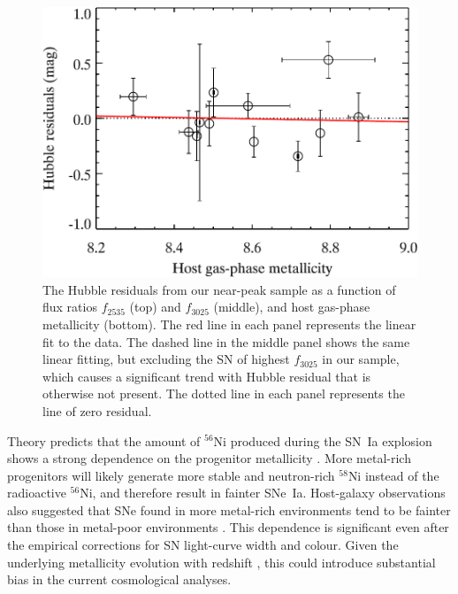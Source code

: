 \documentclass[useAMS,usenatbib]{mn2e}
\begin{document}
\begin{figure}
		\includegraphics[scale=0.49]{plot/metallicity_hrs.pdf}
                \caption{The Hubble residuals from our near-peak sample as a function of flux ratios $f_{2535}$ (top) and $f_{3025}$ (middle), and host gas-phase metallicity (bottom). The red line in each panel represents the linear fit to the data. The dashed line in the middle panel shows the same linear fitting, but excluding the SN of highest $f_{3025}$ in our sample, which causes a significant trend with Hubble residual that is otherwise not present. The dotted line in each panel represents the line of zero residual.}
        \label{uvflux-hrs}
\end{figure}

Theory predicts that the amount of $^{56}$Ni produced during the SN~Ia explosion shows a strong dependence on the progenitor metallicity \citep[e.g.,][]{2003ApJ...590L..83T}. More metal-rich progenitors will likely generate more stable and neutron-rich $^{58}$Ni instead of the radioactive $^{56}$Ni, and therefore result in fainter SNe~Ia. Host-galaxy observations also suggested that SNe found in more metal-rich environments tend to be fainter than those in metal-poor environments \citep[e.g.,][]{2011ApJ...743..172D,2013ApJ...770..108C,2014MNRAS.438.1391P}. This dependence is significant even after the empirical corrections for SN light-curve width and colour. Given the underlying metallicity evolution with redshift \citep[e.g., $\sim0.2$\,dex from $z=0$ to 1;][]{2005ApJ...635..260S}, this could introduce substantial bias in the current cosmological analyses.
\end{document}
